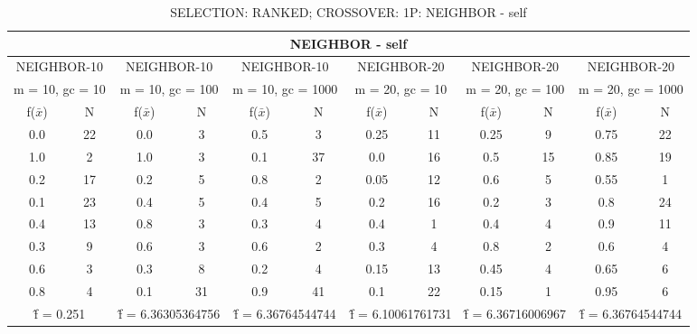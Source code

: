 \begin{table}[H]
	\centering
	\caption{SELECTION: RANKED; CROSSOVER: 1P: NEIGHBOR - self}
	\begin{adjustbox}{width=1\textwidth}
		\begin{tabular}{ |c|c||c|c||c|c||c|c||c|c||c|c| }
			\hline
			\multicolumn{12}{|c|}{NEIGHBOR - self} \\
			\hline
			\multicolumn{2}{|c||}{NEIGHBOR-10} & \multicolumn{2}{c||}{NEIGHBOR-10} & \multicolumn{2}{c||}{NEIGHBOR-10} & \multicolumn{2}{c||}{NEIGHBOR-20} & \multicolumn{2}{c||}{NEIGHBOR-20} & \multicolumn{2}{c|}{NEIGHBOR-20}\\
			\hline
			\multicolumn{2}{|c||}{m = 10, gc = 10} & \multicolumn{2}{c||}{m = 10, gc = 100} & \multicolumn{2}{c||}{m = 10, gc = 1000} & \multicolumn{2}{c||}{m = 20, gc = 10} & \multicolumn{2}{c||}{m = 20, gc = 100} & \multicolumn{2}{c|}{m = 20, gc = 1000}\\
			\hline
			f($\bar{x}$) & N & f($\bar{x}$) & N & f($\bar{x}$) & N & f($\bar{x}$) & N & f($\bar{x}$) & N & f($\bar{x}$) & N\\
			\hline
			\hline
			0.0 & 22 & 0.0 & 3 & 0.5 & 3 & 0.25 & 11 & 0.25 & 9 & 0.75 & 22\\
			1.0 & 2 & 1.0 & 3 & 0.1 & 37 & 0.0 & 16 & 0.5 & 15 & 0.85 & 19\\
			0.2 & 17 & 0.2 & 5 & 0.8 & 2 & 0.05 & 12 & 0.6 & 5 & 0.55 & 1\\
			0.1 & 23 & 0.4 & 5 & 0.4 & 5 & 0.2 & 16 & 0.2 & 3 & 0.8 & 24\\
			0.4 & 13 & 0.8 & 3 & 0.3 & 4 & 0.4 & 1 & 0.4 & 4 & 0.9 & 11\\
			0.3 & 9 & 0.6 & 3 & 0.6 & 2 & 0.3 & 4 & 0.8 & 2 & 0.6 & 4\\
			0.6 & 3 & 0.3 & 8 & 0.2 & 4 & 0.15 & 13 & 0.45 & 4 & 0.65 & 6\\
			0.8 & 4 & 0.1 & 31 & 0.9 & 41 & 0.1 & 22 & 0.15 & 1 & 0.95 & 6\\
			\hline
			\multicolumn{2}{|c||}{\^{f} = 0.251} & \multicolumn{2}{c||}{\^{f} = 6.36305364756} & \multicolumn{2}{c||}{\^{f} = 6.36764544744} & \multicolumn{2}{c||}{\^{f} = 6.10061761731} & \multicolumn{2}{c||}{\^{f} = 6.36716006967} & \multicolumn{2}{c|}{\^{f} = 6.36764544744}\\
			\hline
		\end{tabular}
	\end{adjustbox}
\end{table}
